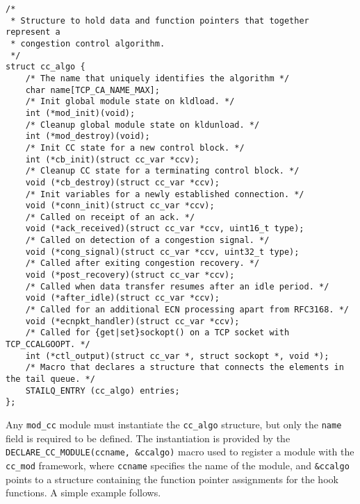 \begin{code}
\begin{verbatim}
/*
 * Structure to hold data and function pointers that together represent a
 * congestion control algorithm.
 */
struct cc_algo {
    /* The name that uniquely identifies the algorithm */
    char name[TCP_CA_NAME_MAX];
    /* Init global module state on kldload. */
    int	(*mod_init)(void);
    /* Cleanup global module state on kldunload. */
    int (*mod_destroy)(void);
    /* Init CC state for a new control block. */
    int	(*cb_init)(struct cc_var *ccv);
    /* Cleanup CC state for a terminating control block. */
    void (*cb_destroy)(struct cc_var *ccv);
    /* Init variables for a newly established connection. */
    void (*conn_init)(struct cc_var *ccv);
    /* Called on receipt of an ack. */
    void (*ack_received)(struct cc_var *ccv, uint16_t type);
    /* Called on detection of a congestion signal. */
    void (*cong_signal)(struct cc_var *ccv, uint32_t type);
    /* Called after exiting congestion recovery. */
    void (*post_recovery)(struct cc_var *ccv);
    /* Called when data transfer resumes after an idle period. */
    void (*after_idle)(struct cc_var *ccv);
    /* Called for an additional ECN processing apart from RFC3168. */
    void (*ecnpkt_handler)(struct cc_var *ccv);
    /* Called for {get|set}sockopt() on a TCP socket with TCP_CCALGOOPT. */
    int (*ctl_output)(struct cc_var *, struct sockopt *, void *);
    /* Macro that declares a structure that connects the elements in the tail queue. */
    STAILQ_ENTRY (cc_algo) entries;
};
\end{verbatim}
\label{code:freebsd-cc}
\end{code}

Any \lstinline{mod_cc} module must instantiate the \lstinline{cc_algo} structure, but only the \lstinline{name} field is required to be defined. The instantiation is provided by the \lstinline{DECLARE_CC_MODULE(ccname, &ccalgo)} macro used to register a module with the \lstinline{cc_mod} framework, where \lstinline{ccname} specifies the name of the module, and \lstinline{&ccalgo} points to a structure containing the function pointer assignments for the hook functions. A simple example follows.

